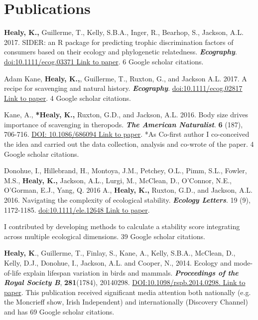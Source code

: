 \documentclass[10pt,a4paper]{article}
\begin{document}
\section{\textbf{Publications}}
\begin{flushleft}


\setlength{\parindent}{0mm}\textbf{Healy, K.,} Guillerme, T., Kelly, S.B.A., Inger, R., Bearhop, S., Jackson, A.L. 2017. SIDER: an R package for predicting trophic discrimination factors of consumers based on their ecology and phylogenetic relatedness. \textit{\textbf{Ecography}}. \href{https://onlinelibrary.wiley.com/doi/abs/10.1111/ecog.03371}{doi:10.1111/ecog.03371 Link to paper}. 6 Google scholar citations.
\bigskip

\setlength{\parindent}{0mm} Adam Kane, \textbf{Healy, K.,}, Guillerme, T., Ruxton, G., and Jackson A.L. 2017. A recipe for scavenging and natural history. \textit{\textbf{Ecography}}. \href{https://onlinelibrary.wiley.com/doi/pdf/10.1111/ecog.02817}{doi:10.1111/ecog.02817 Link to paper}. 4 Google scholar citations.
\bigskip


\setlength{\parindent}{0mm}Kane, A., \textbf{*Healy, K.,} Ruxton, G.D., and Jackson, A.L. 2016. Body size drives importance of scavenging in theropods. \textit{\textbf{The American Naturalist}}. \textbf{6} (187), 706-716. \href{https://www.researchgate.net/profile/Kevin_Healy/publication/301279301_Body_Size_as_a_Driver_of_Scavenging_in_Theropod_Dinosaurs/links/570f8b2a08ae38897ba19c35.pdf.}{DOI: 10.1086/686094 Link to paper}. *As Co-first author I co-conceived the idea and carried out the data collection, analysis and co-wrote of the paper. 4 Google scholar citations.

\bigskip

\setlength{\parindent}{0mm}Donohue, I., Hillebrand, H., Montoya, J.M., Petchey, O.L., Pimm, S.L., Fowler, M.S., \textbf{Healy, K.,} Jackson, A.L., Lurgi, M., McClean, D., O'Connor, N.E., O'Gorman, E.J., Yang, Q. 2016
 A., \textbf{Healy, K.,} Ruxton, G.D., and Jackson, A.L. 2016. Navigating the complexity of ecological stability. \textit{\textbf{Ecology Letters}}. 19 (9), 1172-1185. \href{https://onlinelibrary.wiley.com/doi/abs/10.1111/ele.12648}{doi:10.1111/ele.12648 Link to paper}.
\par{\fontsize{10.5}{10} I contributed by developing methods to calculate a stability score integrating across multiple ecological dimensions. 39 Google scholar citations.}

\bigskip

\textbf{Healy, K}., Guillerme, T., Finlay, S., Kane, A., Kelly, S.B.A., McClean, D., Kelly, D.J., Donohue, I., Jackson, A.L. and Cooper, N., 2014. Ecology and mode-of-life explain lifespan variation in birds and mammals. \textit{\textbf{Proceedings of the Royal Society B}}, \textbf{281}(1784), 20140298. \href{http://rspb.royalsocietypublishing.org/content/281/1784/20140298}{DOI:10.1098/rspb.2014.0298. Link to paper}. This publication received significant media attention both nationally (e.g. the Moncrieff show, Irish Independent) and internationally (Discovery Channel) and has 69 Google scholar citations.


\end{flushleft}
\end{document}
